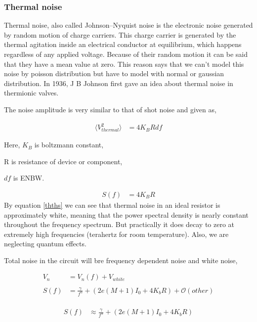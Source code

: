 \documentclass[12pt]{article}
\begin{document}
\subsubsection{Thermal noise \label{thth}}

Thermal noise, also called Johnson–Nyquist noise is the electronic noise generated by random motion of charge carriers. This charge carrier is generated by the thermal agitation inside an electrical conductor at equilibrium, which happens regardless of any applied voltage. Because of their random motion it can be said that they have a mean value at zero. This reason says that we can't model this noise by poisson distribution but have to model with normal or gaussian distribution. In 1936, J B Johnson first gave an idea about thermal noise in thermionic valves. \cite{johnson}

The noise amplitude is very similar to that of shot noise and given as,

\begin{align}\label{ththvo}
\langle V_{thermal}^2\rangle & = 4 K_B R df
\end{align}

Here, $K_B$ is boltzmann constant,

R is resistance of device or component,

$df$ is ENBW.

\begin{align}\label{thths}
S(f) & = 4 K_B R
\end{align}
By equation \ref{thths} we can see that thermal noise in an ideal resistor is approximately white, meaning that the power spectral density is nearly constant throughout the frequency spectrum. But practically it does decay to zero at extremely high frequencies (terahertz for room temperature). Also, we are neglecting quantum effects. 


Total noise in the circuit will bre frequency dependent noise and white noise,


\begin{align*}
V_n & = V_{n}(f)+ V_{white}\\
\\
S(f) & = \frac{\gamma}{f^{\alpha}}+(2e(M+1)I_0+4K_bR)+\mathcal{O}(other)\\

\end{align*}

\begin{align}\label{theoryvn}
S(f) & \approx \frac{\gamma}{f^{\alpha}}+(2e(M+1)I_0+4K_bR)
\end{align}
\end{document}
